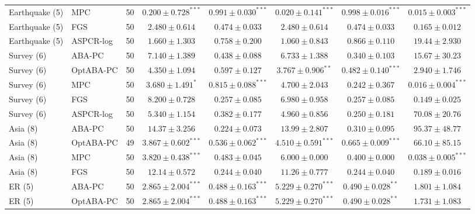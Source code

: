\begin{table}[t]
{\begin{tabular}{llrccccc}
Earthquake (5) & MPC & 50 & $\mathbf{0.200\pm0.728}^{\ast\ast\ast}$ & $\mathbf{0.991\pm0.030}^{\ast\ast\ast}$ & $\mathbf{0.020\pm0.141}^{\ast\ast\ast}$ & $\mathbf{0.998\pm0.016}^{\ast\ast\ast}$ & $\mathbf{0.015\pm0.003}^{\ast\ast\ast}$\\
Earthquake (5) & FGS & 50 & $2.480\pm0.614$ & $0.474\pm0.033$ & $2.480\pm0.614$ & $0.474\pm0.033$ & $0.165\pm0.012$\\
Earthquake (5) & ASPCR-log & 50 & $1.660\pm1.303$ & $0.758\pm0.200$ & $1.060\pm0.843$ & $0.866\pm0.110$ & $19.44\pm2.930$\\
\midrule
Survey (6) & ABA-PC & 50 & $7.140\pm1.389$ & $0.438\pm0.088$ & $6.733\pm1.388$ & $0.340\pm0.103$ & $15.67\pm30.23$\\
Survey (6) & OptABA-PC & 50 & $4.350\pm1.094$ & $0.597\pm0.127$ & $\mathbf{3.767\pm0.906}^{\ast\ast}$ & $\mathbf{0.482\pm0.140}^{\ast\ast\ast}$ & $2.940\pm1.746$\\
Survey (6) & MPC & 50 & $\mathbf{3.680\pm1.491}^{\ast}$ & $\mathbf{0.815\pm0.088}^{\ast\ast\ast}$ & $4.700\pm2.043$ & $0.242\pm0.367$ & $\mathbf{0.016\pm0.004}^{\ast\ast\ast}$\\
Survey (6) & FGS & 50 & $8.200\pm0.728$ & $0.257\pm0.085$ & $6.980\pm0.958$ & $0.257\pm0.085$ & $0.149\pm0.025$\\
Survey (6) & ASPCR-log & 50 & $5.340\pm1.154$ & $0.382\pm0.177$ & $4.960\pm0.856$ & $0.250\pm0.181$ & $70.08\pm20.76$\\
\midrule
Asia (8) & ABA-PC & 50 & $14.37\pm3.256$ & $0.224\pm0.073$ & $13.99\pm2.807$ & $0.310\pm0.095$ & $95.37\pm48.77$\\
Asia (8) & OptABA-PC & 49 & $\mathbf{3.867\pm0.602}^{\ast\ast\ast}$ & $\mathbf{0.536\pm0.062}^{\ast\ast\ast}$ & $\mathbf{4.510\pm0.591}^{\ast\ast\ast}$ & $\mathbf{0.665\pm0.009}^{\ast\ast\ast}$ & $66.10\pm85.15$\\
Asia (8) & MPC & 50 & $\mathbf{3.820\pm0.438}^{\ast\ast\ast}$ & $0.483\pm0.045$ & $6.000\pm0.000$ & $0.400\pm0.000$ & $\mathbf{0.038\pm0.005}^{\ast\ast\ast}$\\
Asia (8) & FGS & 50 & $12.14\pm0.572$ & $0.244\pm0.040$ & $11.26\pm0.777$ & $0.244\pm0.040$ & $0.189\pm0.016$\\
\midrule
ER (5) & ABA-PC & 50 & $\mathbf{2.865\pm2.004}^{\ast\ast\ast}$ & $\mathbf{0.488\pm0.163}^{\ast\ast\ast}$ & $\mathbf{5.229\pm0.270}^{\ast\ast\ast}$ & $\mathbf{0.490\pm0.028}^{\ast\ast}$ & $1.801\pm1.084$\\
ER (5) & OptABA-PC & 50 & $\mathbf{2.865\pm2.004}^{\ast\ast\ast}$ & $\mathbf{0.488\pm0.163}^{\ast\ast\ast}$ & $\mathbf{5.229\pm0.270}^{\ast\ast\ast}$ & $\mathbf{0.490\pm0.028}^{\ast\ast}$ & $1.731\pm1.083$\\

\end{tabular}}
\end{table}
